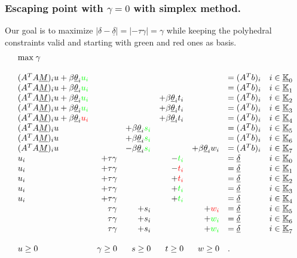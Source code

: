 \documentclass[fleqn]{report} %
\begin{document}
\subsubsection{Escaping point with $\gamma=0$ with simplex method.}
Our goal is to maximize $\left|\delta -\underline{\delta}\right|=\left|-\tau\gamma\right|=\gamma$ while keeping the polyhedral constraints valid and  starting with green and red ones as basis.
\[
\begin{array}{lrrrrll}
\text{max}\;\gamma&&&&&&\\
&&&&&&\\
(A^TA\underline{M})_iu+\beta\underline{\theta}_i\textcolor{green}{u_i}&&&&&=(A^Tb)_i&i\in\underline{\mathbb{K}}_0\\
(A^TA\underline{M})_iu+\beta\underline{\theta}_i\textcolor{green}{u_i}&&&&&=(A^Tb)_i&i\in\underline{\mathbb{K}}_1\\
(A^TA\underline{M})_iu+\beta\underline{\theta}_i\textcolor{green}{u_i}&&&+\beta\underline{\theta}_it_i&&=(A^Tb)_i&i\in\underline{\mathbb{K}}_2\\
(A^TA\underline{M})_iu+\beta\underline{\theta}_i\textcolor{green}{u_i}&&&+\beta\underline{\theta}_it_i&&=(A^Tb)_i&i\in\underline{\mathbb{K}}_3\\
(A^TA\underline{M})_iu+\beta\underline{\theta}_i\textcolor{red}{u_i}&&&+\beta\underline{\theta}_it_i&&=(A^Tb)_i&i\in\underline{\mathbb{K}}_4\\
(A^TA\underline{M})_iu&&+\beta\underline{\theta}_i\textcolor{green}{s_i}&&&=(A^Tb)_i&i\in\underline{\mathbb{K}}_5\\
(A^TA\underline{M})_iu&&+\beta\underline{\theta}_i\textcolor{green}{s_i}&&&=(A^Tb)_i&i\in\underline{\mathbb{K}}_6\\
(A^TA\underline{M})_iu&&-\beta\underline{\theta}_i\textcolor{green}{s_i}&&+\beta\underline{\theta}_iw_i&=(A^Tb)_i&i\in\underline{\mathbb{K}}_7\\
u_i&+\tau\gamma&&-\textcolor{green}{t_i}&&=\underline{\delta}&i\in\underline{\mathbb{K}}_0\\
u_i&+\tau\gamma&&-\textcolor{red}{t_i}&&=\underline{\delta}&i\in\underline{\mathbb{K}}_1\\
u_i&+\tau\gamma&&+\textcolor{red}{t_i}&&=\underline{\delta}&i\in\underline{\mathbb{K}}_2\\
u_i&+\tau\gamma&&+\textcolor{green}{t_i}&&=\underline{\delta}&i\in\underline{\mathbb{K}}_3\\
u_i&+\tau\gamma&&+\textcolor{green}{t_i}&&=\underline{\delta}&i\in\underline{\mathbb{K}}_4\\
&\tau\gamma&+s_i&&+\textcolor{red}{w_i}&=\underline{\delta}&i\in\underline{\mathbb{K}}_5\\
&\tau\gamma&+s_i&&+\textcolor{green}{w_i}&=\underline{\delta}&i\in\underline{\mathbb{K}}_6\\
&\tau\gamma&+s_i&&+\textcolor{green}{w_i}&=\underline{\delta}&i\in\underline{\mathbb{K}}_7\\
&&&&&\\
u\geq0&\gamma\geq0&s\geq0&t\geq0&w\geq0&.\\
\end{array} 
\]
\end{document}
